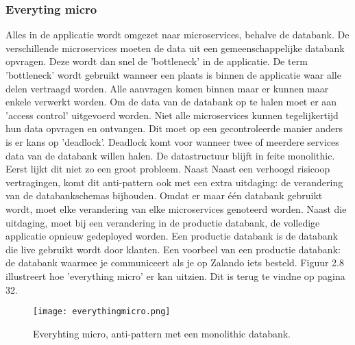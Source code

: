 \subsubsection{Everyting micro}
Alles in de applicatie wordt omgezet naar microservices, behalve de databank. De verschillende microservices moeten de data uit een gemeenschappelijke databank opvragen. Deze wordt dan snel de 'bottleneck' in de applicatie. De term 'bottleneck' wordt gebruikt wanneer een plaats is binnen de applicatie waar alle delen vertraagd worden. Alle aanvragen komen binnen maar er kunnen maar enkele verwerkt worden.
Om de data van de databank op te halen moet er aan 'access control' uitgevoerd worden. Niet alle microservices kunnen tegelijkertijd hun data opvragen en ontvangen.
Dit moet op een gecontroleerde manier anders is er kans op 'deadlock'. Deadlock komt voor wanneer twee of meerdere services data van de databank willen halen. 
De datastructuur blijft in feite monolithic.
Eerst lijkt dit niet zo een groot probleem. Naast Naast een verhoogd risicoop vertragingen, komt dit anti-pattern ook met een extra uitdaging: de verandering van de databankschemas bijhouden. Omdat er maar één databank gebruikt wordt, moet elke verandering van elke microservices genoteerd worden. Naast die uitdaging, moet bij een verandering in de productie databank, de volledige applicatie opnieuw gedeployed worden. Een productie databank is de databank die live gebruikt wordt door klanten. Een voorbeel van een productie databank: de databank waarmee je communiceert als je op Zalando iets besteld. 
Figuur 2.8 illustreert hoe 'everything micro' er kan uitzien. Dit is terug te vindne op pagina 32.
\begin{figure}[h!]
	\texttt{[image: everythingmicro.png]}
	\centering
	\caption{Everyhting micro, anti-pattern met een monolithic databank. \textcite{Monson2019}}
\end{figure}

